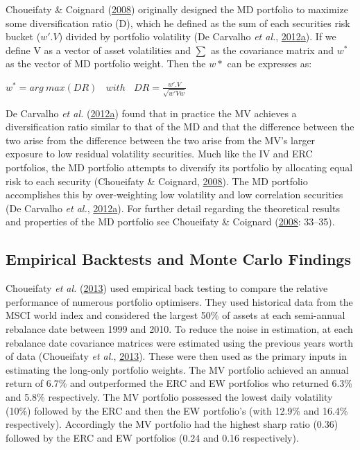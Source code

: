 \documentclass[11pt,preprint, authoryear]{elsarticle}
\numberwithin{equation}{section}
\numberwithin{figure}{section}
\numberwithin{table}{section}
\begin{document}
Choueifaty \& Coignard (\protect\hyperlink{ref-choueifaty2008}{2008})
originally designed the MD portfolio to maximize some diversification
ratio (D), which he defined as the sum of each securities risk bucket
(\(w'.V\)) divided by portfolio volatility (De Carvalho \emph{et al.},
\protect\hyperlink{ref-leote}{2012}\protect\hyperlink{ref-leote}{a}). If
we define V as a vector of asset volatilities and \(\sum\) as the
covariance matrix and \(w^*\) as the vector of MD portfolio weight. Then
the \(w*\) can be expresses as:

\begin{center} 
$w^* =arg\ max(DR)\ \ \ \ with \ \ \ \  DR= \frac{w'.V}{\sqrt{w'Vw}}$ 
\end{center}

De Carvalho \emph{et al.}
(\protect\hyperlink{ref-leote}{2012}\protect\hyperlink{ref-leote}{a})
found that in practice the MV achieves a diversification ratio similar
to that of the MD and that the difference between the two arise from the
difference between the two arise from the MV's larger exposure to low
residual volatility securities. Much like the IV and ERC portfolios, the
MD portfolio attempts to diversify its portfolio by allocating equal
risk to each security (Choueifaty \& Coignard,
\protect\hyperlink{ref-choueifaty2008}{2008}). The MD portfolio
accomplishes this by over-weighting low volatility and low correlation
securities (De Carvalho \emph{et al.},
\protect\hyperlink{ref-leote}{2012}\protect\hyperlink{ref-leote}{a}).
For further detail regarding the theoretical results and properties of
the MD portfolio see Choueifaty \& Coignard
(\protect\hyperlink{ref-choueifaty2008}{2008}: 33--35).

\hypertarget{empirical-backtests-and-monte-carlo-findings}{%
\subsection{Empirical Backtests and Monte Carlo
Findings}\label{empirical-backtests-and-monte-carlo-findings}}

Choueifaty \emph{et al.} (\protect\hyperlink{ref-choueifaty2013}{2013})
used empirical back testing to compare the relative performance of
numerous portfolio optimisers. They used historical data from the MSCI
world index and considered the largest 50\% of assets at each
semi-annual rebalance date between 1999 and 2010. To reduce the noise in
estimation, at each rebalance date covariance matrices were estimated
using the previous years worth of data (Choueifaty \emph{et al.},
\protect\hyperlink{ref-choueifaty2013}{2013}). These were then used as
the primary inputs in estimating the long-only portfolio weights. The MV
portfolio achieved an annual return of 6.7\% and outperformed the ERC
and EW portfolios who returned 6.3\% and 5.8\% respectively. The MV
portfolio possessed the lowest daily volatility (10\%) followed by the
ERC and then the EW portfolio's (with 12.9\% and 16.4\% respectively).
Accordingly the MV portfolio had the highest sharp ratio (0.36) followed
by the ERC and EW portfolios (0.24 and 0.16 respectively).
\end{document}

